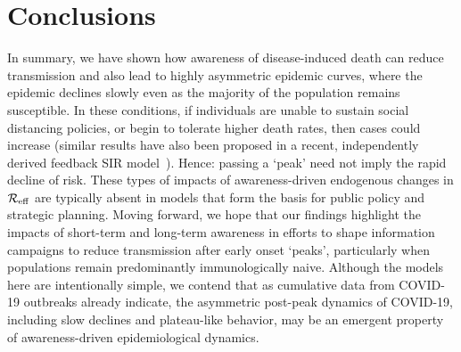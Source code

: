\section{Conclusions}
In summary, we have shown how awareness of disease-induced death can reduce
transmission and also lead
to highly asymmetric epidemic curves, where the epidemic declines slowly 
even as the majority of the population remains susceptible.
In these conditions, if individuals are unable
to sustain social
distancing policies, or begin to tolerate higher death rates, then cases 
could increase (similar results have also been proposed in a recent, independently derived feedback SIR model~\citep{franco2020feedback}). 
Hence: passing a `peak' need not imply
the rapid decline of risk.  These types of impacts of awareness-driven
endogenous changes in ${\cal{R}}_{\mathrm{eff}}$ are typically
absent in models that form the basis for public policy and strategic planning.
Moving forward, we hope that our findings
highlight the impacts of short-term and long-term awareness 
in efforts to shape information campaigns
to reduce transmission after early onset `peaks', particularly
when populations remain predominantly immunologically naive.
Although the models here are intentionally simple,
we contend that as cumulative data from COVID-19 outbreaks already
indicate, the asymmetric post-peak dynamics of COVID-19, including
slow declines and plateau-like behavior, may be an emergent
property of awareness-driven epidemiological dynamics.

